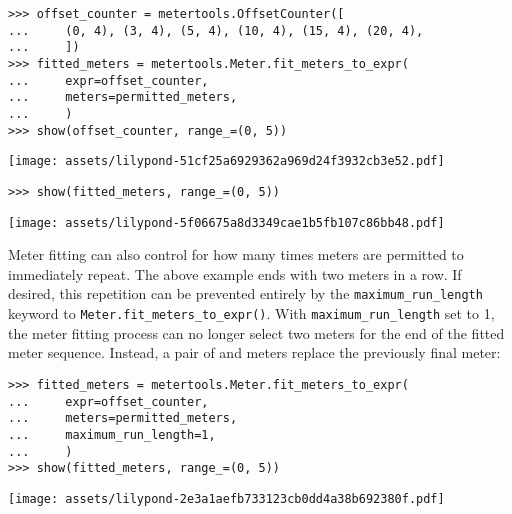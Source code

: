 \begin{abjadbookoutput}
\begin{singlespacing}
\vspace{-0.5\baselineskip}
\begin{verbatim}
>>> offset_counter = metertools.OffsetCounter([
...     (0, 4), (3, 4), (5, 4), (10, 4), (15, 4), (20, 4),
...     ])
>>> fitted_meters = metertools.Meter.fit_meters_to_expr(
...     expr=offset_counter,
...     meters=permitted_meters,
...     )
>>> show(offset_counter, range_=(0, 5))
\end{verbatim}
\noindent\texttt{[image: assets/lilypond-51cf25a6929362a969d24f3932cb3e52.pdf]}
\begin{verbatim}
>>> show(fitted_meters, range_=(0, 5))
\end{verbatim}
\noindent\texttt{[image: assets/lilypond-5f06675a8d3349cae1b5fb107c86bb48.pdf]}
\end{singlespacing}
\end{abjadbookoutput}

\noindent Meter fitting can also control for how many times meters are
permitted to immediately repeat. The above example ends with two 
meters in a row. If desired, this repetition can be prevented entirely by the
\texttt{maximum\_run\_length} keyword to
\texttt{Meter.fit\_meters\_to\_expr()}. With \texttt{maximum\_run\_length} set
to 1, the meter fitting process can no longer select two  meters
for the end of the fitted meter sequence. Instead, a pair of  and
 meters replace the previously final  meter:

\begin{comment}
<abjad>
fitted_meters = metertools.Meter.fit_meters_to_expr(
    expr=offset_counter,
    meters=permitted_meters,
    maximum_run_length=1,
    )
show(fitted_meters, range_=(0, 5))
</abjad>
\end{comment}

\begin{abjadbookoutput}
\begin{singlespacing}
\vspace{-0.5\baselineskip}
\begin{verbatim}
>>> fitted_meters = metertools.Meter.fit_meters_to_expr(
...     expr=offset_counter,
...     meters=permitted_meters,
...     maximum_run_length=1,
...     )
>>> show(fitted_meters, range_=(0, 5))
\end{verbatim}
\noindent\texttt{[image: assets/lilypond-2e3a1aefb733123cb0dd4a38b692380f.pdf]}
\end{singlespacing}
\end{abjadbookoutput}

